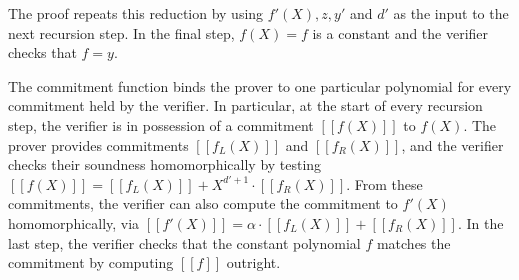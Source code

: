 The proof repeats this reduction by using $f'(X),z,y'$ and $d'$ as the input to the next recursion step. In the final step, $f(X) = f$ is a constant and the verifier checks that $f=y$.%

The commitment function binds the prover to one particular polynomial for every commitment held by the verifier. In particular, at the start of every recursion step, the verifier is in possession of a commitment $[\![f(X)]\!]$ to $f(X)$. The prover provides commitments $[\![f_L(X)]\!]$ and $[\![f_R(X)]\!]$, and the verifier checks their soundness homomorphically by testing $[\![f(X)]\!] = [\![f_L(X)]\!] + X^{d'+1} \! \cdot \! [\![f_R(X)]\!]$. From these commitments, the verifier can also compute the commitment to $f'(X)$ homomorphically, via $[\![f'(X)]\!] = \alpha \! \cdot \! [\![f_L(X)]\!] + [\![f_R(X)]\!]$. In the last step, the verifier checks that the constant polynomial $f$ matches the commitment by computing $[\![f]\!]$ outright. 

